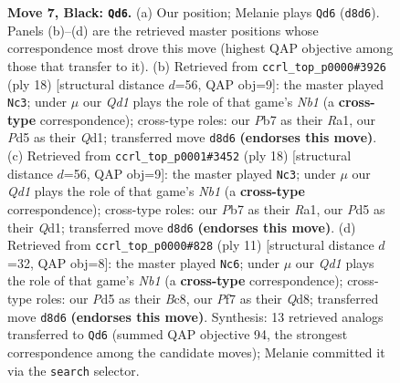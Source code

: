 \documentclass[11pt]{article}
\begin{document}
\begin{figure}[p]
\caption{\textbf{Move 7, Black: \texttt{Qd6}.} (a) Our position; Melanie plays \texttt{Qd6} (\texttt{d8d6}). Panels (b)--(d) are the retrieved master positions whose correspondence most drove this move (highest QAP objective among those that transfer to it). (b) Retrieved from \texttt{ccrl\_top\_p0000\#3926} (ply 18) [structural distance $d$=56, QAP obj=9]: the master played \texttt{Nc3}; under $\mu$ our \emph{Qd1} plays the role of that game's \emph{Nb1} (a \textbf{cross-type} correspondence); cross-type roles: our \emph{P}b7 as their \emph{R}a1, our \emph{P}d5 as their \emph{Q}d1; transferred move \texttt{d8d6} \textbf{(endorses this move)}. (c) Retrieved from \texttt{ccrl\_top\_p0001\#3452} (ply 18) [structural distance $d$=56, QAP obj=9]: the master played \texttt{Nc3}; under $\mu$ our \emph{Qd1} plays the role of that game's \emph{Nb1} (a \textbf{cross-type} correspondence); cross-type roles: our \emph{P}b7 as their \emph{R}a1, our \emph{P}d5 as their \emph{Q}d1; transferred move \texttt{d8d6} \textbf{(endorses this move)}. (d) Retrieved from \texttt{ccrl\_top\_p0000\#828} (ply 11) [structural distance $d$=32, QAP obj=8]: the master played \texttt{Nc6}; under $\mu$ our \emph{Qd1} plays the role of that game's \emph{Nb1} (a \textbf{cross-type} correspondence); cross-type roles: our \emph{P}d5 as their \emph{B}c8, our \emph{P}f7 as their \emph{Q}d8; transferred move \texttt{d8d6} \textbf{(endorses this move)}. Synthesis: 13 retrieved analogs transferred to \texttt{Qd6} (summed QAP objective 94, the strongest correspondence among the candidate moves); Melanie committed it via the \texttt{search} selector.}
\label{fig:thought-m13}
\end{figure}

\clearpage
\end{document}
